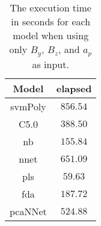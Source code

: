 \begin{table}[!ht]
	\centering
	\begin{tabular}{|c|c|}
		\hline
		Model & elapsed \\ \hline
		svmPoly & $856.54$ \\ \hline
		C5.0 & $388.50$ \\ \hline
		nb & $155.84$ \\ \hline
		nnet & $651.09$ \\ \hline
		pls & $59.63$ \\ \hline
		fda & $187.72$ \\ \hline
		pcaNNet & $524.88$ \\ \hline
	\end{tabular}
	\caption{The execution time in seconds for each model when using only $B_{y}$, $B_{z}$, and $a_{p}$ as input.}
	\label{tab:time:yzap:total}
\end{table}
